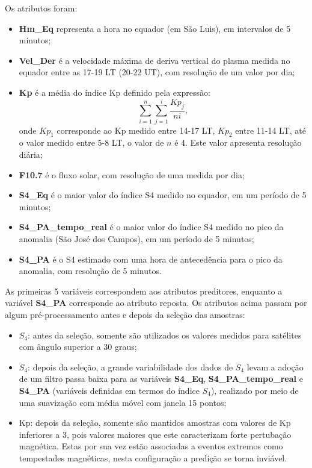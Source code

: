 Os atributos foram:

\begin{itemize}
\item {\bf Hm\_Eq} representa a hora no equador (em São Luis), em intervalos de 5 minutos;
\item {\bf Vel\_Der} é a velocidade máxima de deriva vertical do plasma medida no equador entre as 17-19 LT (20-22 UT), com resolução de um valor por dia;
\item {\bf Kp} é a média do índice Kp definido pela expressão:
\begin{equation}
\sum_{i=1}^{n}\sum_{j=1}^{i}\frac{Kp_{j}}{ni}\mbox{,}~
\end{equation}
onde $Kp_1$ corresponde ao Kp medido entre 14-17 LT, $Kp_2$ entre 11-14 LT, até o valor medido entre 5-8 LT, o valor de $n$ é 4. Este valor apresenta resolução diária;
\item {\bf F10.7} é o fluxo solar, com resolução de uma medida por dia;
\item {\bf S4\_Eq} é o maior valor do índice S4 medido no equador, em um período de 5 minutos;
\item {\bf S4\_PA\_tempo\_real} é o maior valor do índice S4 medido no pico da anomalia (São José dos Campos), em um período de 5 minutos;
\item {\bf S4\_PA} é o S4 estimado com uma hora de antecedência para o pico da anomalia, com resolução de 5 minutos.
\end{itemize}

As primeiras 5 variáveis correspondem aos atributos preditores, enquanto a variável {\bf S4\_PA} corresponde ao atributo reposta. Os atributos acima passam por algum pré-processamento antes e depois da seleção das amostras:

\begin{itemize}
\item $S_4$: antes da seleção, somente são utilizados os valores medidos para satélites com ângulo superior a 30 graus;
\item $S_4$: depois da seleção, a grande variabilidade dos dados de $S_4$ levam a adoção de um filtro passa baixa para as variáveis {\bf S4\_Eq}, {\bf S4\_PA\_tempo\_real} e {\bf S4\_PA} (variáveis definidas em termos do índice $S_4$), realizado por meio de uma suavização com média móvel com janela 15 pontos;
\item Kp: depois da seleção, somente são mantidos amostras com valores de Kp inferiores a 3, pois valores maiores que este caracterizam forte pertubação magnética. Estas por sua vez estão associadas a eventos extremos como tempestades magnéticas, nesta configuração a predição se torna inviável.
\end{itemize}

